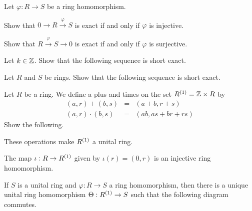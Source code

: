 \begin{exercise}
Let \(\varphi : R \rightarrow S\) be a ring homomorphism.
\begin{proplist*}
\item Show that \(0 \rightarrow R \overset{\varphi}{\rightarrow} S\) is exact if and only if \(\varphi\) is injective.
\item Show that \(R \overset{\varphi}{\rightarrow} S \rightarrow 0\) is exact if and only if \(\varphi\) is surjective.
\end{proplist*}
\end{exercise}

\begin{exercise}
Let \(k \in \mathbb{Z}\). Show that the following sequence is short exact.
\begin{center}
\end{center}
\end{exercise}

\begin{exercise}
Let \(R\) and \(S\) be rings. Show that the following sequence is short exact.
\begin{center}
\end{center}
\end{exercise}

\begin{exercise} \label{exerc:adj-unit}
Let \(R\) be a ring. We define a plus and times on the set \({R}^{(1)} = \mathbb{Z} \times R\) by
\begin{eqnarray*}
(a,r) + (b,s) & = & (a+b,r+s) \\
(a,r) \cdot (b,s) & = & (ab, as + br + rs)
\end{eqnarray*}
Show the following.
\begin{proplist}
\item These operations make \({R}^{(1)}\) a unital ring.
\item The map \(\iota : R \rightarrow {R}^{(1)}\) given by \(\iota(r) = (0,r)\) is an injective ring homomorphism.
\item If \(S\) is a unital ring and \(\varphi : R \rightarrow S\) a ring homomorphism, then there is a unique unital ring homomorphism \(\Theta : {R}^{(1)} \rightarrow S\) such that the following diagram commutes.
\begin{center}
\end{center}
\end{proplist}
\end{exercise}

